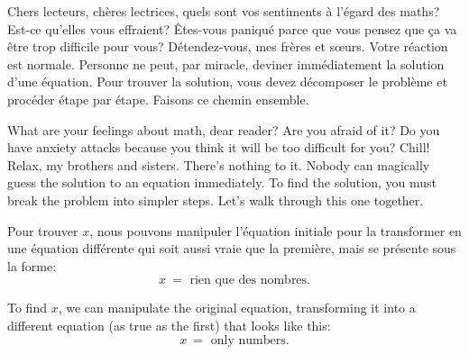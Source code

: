 \begin{paracol}{2}

	\begin{leftcolumn*}

		\begin{otherlanguage}{french}
	Chers lecteurs, chères lectrices, quels sont vos sentiments à l'égard des maths?
	Est-ce qu'elles vous effraient?
	Êtes-vous paniqué parce que vous pensez que ça va être trop difficile pour vous?
	Détendez-vous, mes frères et sœurs. Votre réaction est normale.
	Personne ne peut, par miracle, deviner immédiatement la solution d'une équation.
	Pour trouver la solution, vous devez décomposer le problème et procéder étape par étape.
	Faisons ce chemin ensemble.


		\end{otherlanguage}

	\end{leftcolumn*}



	\begin{rightcolumn}

	What are your feelings about math, dear reader? Are you afraid of it? 
	Do you have anxiety attacks because you think it will be too difficult for you?
	Chill! Relax, my brothers and sisters. There's nothing to it.
	Nobody can magically guess the solution to an equation immediately.
	To find the solution, you must break the problem into simpler steps.
	Let's walk through this one together.



	\end{rightcolumn}

\end{paracol}

\begin{paracol}{2}

	\begin{leftcolumn*}

		\begin{otherlanguage}{french}
	Pour trouver $x$,
	nous pouvons manipuler l'équation initiale pour la transformer en une équation différente qui soit aussi vraie que la première,
	mais se présente sous la forme: 
	\[ 
		x \ = \textrm{ rien que des nombres.}
	\]

		\end{otherlanguage}

	\end{leftcolumn*}



	\begin{rightcolumn}

	To find $x$, we can manipulate the original equation, 
	transforming it into a different equation (as true as the first) that looks like this:
	\[
	  x \ = \textrm{ only numbers.}
	\]



	\end{rightcolumn}

\end{paracol}

